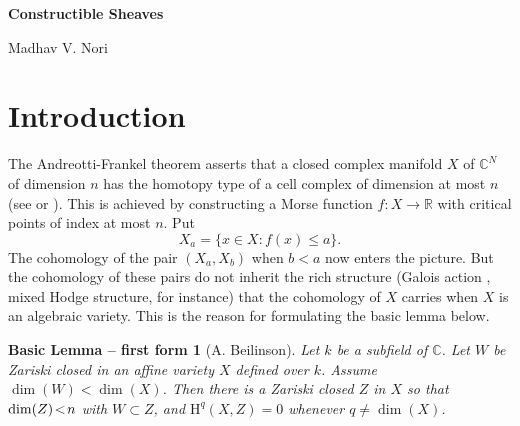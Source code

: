 \documentclass[10pt,twoside]{article}
\newtheorem{blemma}{Basic Lemma -- first form}
\newcommand{\homology}{{\mathrm {H}}}
\newcommand{\C}{{\mathbb {C}}}
\newcommand{\R}{{\mathbb {R}}}
\newcommand{\myauthor}[1]{\begin{center}%
{\Large #1}\bigskip
\end{center}}
\begin{document}

\thispagestyle{plain}
\begin{center}
{\LARGE\bf Constructible Sheaves}
\end{center}

\myauthor{Madhav V. Nori}

\begin{abstract}
 This article contains a proof of the basic lemma, which
yields a motivic proof of the Andreotti Frankel theorem 
for affine varieties. Next, it is shown that
the triangulated category of ``Cohomologically
Constructible Sheaves'' (as it is referred to in the Riemann-Hilbert
correspondence) coincides with the derived category of bounded 
complexes of constructible sheaves. It is also shown that higher
direct images and the sheaf-Ext groups are effaceable in
the category of constructible sheaves. 
\end{abstract}

\section*{Introduction}

     The Andreotti-Frankel theorem asserts that a 
closed complex manifold $X$ of $\C ^N$ of dimension $n$ has the
homotopy type of a cell complex of dimension at most $n$ (see \cite{nori:AF}
or \cite{nori:Mil}). This is achieved by constructing a Morse function 
$f:X\to \R$ with critical points of index at most $n$. Put 
$$
X_a=\{ x\in X: f(x)\leq a\}.
$$ 
The cohomology of the
pair $(X_a,X_b)$ when $b<a$ now enters the picture. But
 the cohomology of these pairs do
not inherit the rich structure (Galois action , mixed Hodge structure,
for instance) that the cohomology of $X$ carries when $X$ is an 
algebraic variety. This is the reason for 
formulating the basic lemma below. 


\begin{blemma}[A. Beilinson] 
Let $k$ be a subfield of $\C$. 
Let $W$ be Zariski closed in an affine variety
$X$ defined over $k$. Assume $\dim(W)\!<\!\dim(X)$. 
Then there is a Zariski 
closed $Z$ in $X$ so that $\dim(Z)\!<\nolinebreak\! n$ with $W\subset Z$, 
and $\homology^q(X,Z)=0$ whenever $q\neq \dim (X)$.
\end{blemma}
\end{document}
